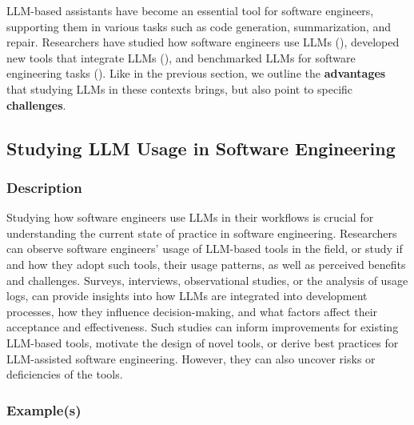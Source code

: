 LLM-based assistants have become an essential tool for software engineers, supporting them in various tasks such as code generation, summarization, and repair.
Researchers have studied how software engineers use LLMs (\llmusage), developed new tools that integrate LLMs (\newtools), and benchmarked LLMs for software engineering tasks  (\benchmarkingtasks).
Like in the previous section, we outline the \textbf{advantages} that studying LLMs in these contexts brings, but also point to specific \textbf{challenges}.


\subsection{Studying LLM Usage in Software Engineering}
\label{sec:studying-llm-usage-in-software-engineering}

\subsubsection{Description}

Studying how software engineers use LLMs in their workflows is crucial for understanding the current state of practice in software engineering.
Researchers can observe software engineers' usage of LLM-based tools in the field, or study if and how they adopt such tools, their usage patterns, as well as perceived benefits and challenges.
Surveys, interviews, observational studies, or the analysis of usage logs, can provide insights into how LLMs are integrated into development processes, how they influence decision-making, and what factors affect their acceptance and effectiveness. 
Such studies can inform improvements for existing LLM-based tools, motivate the design of novel tools, or derive best practices for LLM-assisted software engineering.
However, they can also uncover risks or deficiencies of the tools.

\subsubsection{Example(s)}

